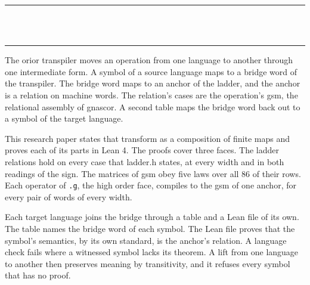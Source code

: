 \thispagestyle{empty}
\begin{center}
  \rule{\textwidth}{0.4pt}\\[0.9em]
  {\Large{}}\\[0.7em]
  \rule{\textwidth}{0.4pt}
\end{center}
\bigskip

\noindent The orior transpiler moves an operation from one language to another through one intermediate
form. A symbol of a source language maps to a bridge word of the transpiler. The bridge word maps to an anchor
of the ladder, and the anchor is a relation on machine words. The relation's cases are the operation's gsm, the
relational assembly of gnascor. A second table maps the bridge word back out to a symbol of the target language.

This research paper states that transform as a composition of finite maps and proves each of its parts in Lean
4. The proofs cover three faces. The ladder relations hold on every case that ladder.h states, at every width and
in both readings of the sign. The matrices of gsm obey five laws over all 86 of their rows. Each operator of
\texttt{.g}, the high order face, compiles to the gsm of one anchor, for every pair of words of every width.

Each target language joins the bridge through a table and a Lean file of its own. The table names the bridge
word of each symbol. The Lean file proves that the symbol's semantics, by its own standard, is the anchor's
relation. A language check fails where a witnessed symbol lacks its theorem. A lift from one language to another
then preserves meaning by transitivity, and it refuses every symbol that has no proof.
